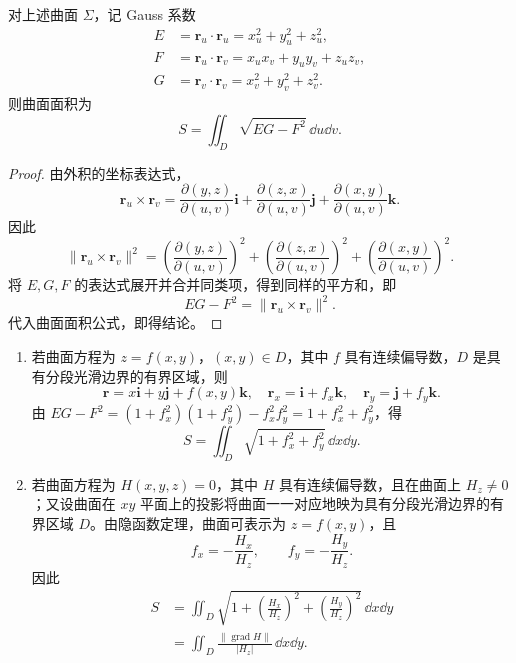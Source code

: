 \begin{theorem}
对上述曲面 $\Sigma$，记 Gauss 系数
\[
\begin{aligned}
E&=\boldsymbol r_u\cdot\boldsymbol r_u=x_u^2+y_u^2+z_u^2,\\
F&=\boldsymbol r_u\cdot\boldsymbol r_v=x_ux_v+y_uy_v+z_uz_v,\\
G&=\boldsymbol r_v\cdot\boldsymbol r_v=x_v^2+y_v^2+z_v^2.
\end{aligned}
\]
则曲面面积为
\[
S=\displaystyle\iint_D\sqrt{EG-F^2}\,\dd u\dd v.
\]
\end{theorem}
\begin{proof}
由外积的坐标表达式，
\[
\boldsymbol r_u\times\boldsymbol r_v
=\frac{\partial(y,z)}{\partial(u,v)}\boldsymbol i
+\frac{\partial(z,x)}{\partial(u,v)}\boldsymbol j
+\frac{\partial(x,y)}{\partial(u,v)}\boldsymbol k.
\]
因此
\[
\lVert\boldsymbol r_u\times\boldsymbol r_v\rVert^2
=\left(\frac{\partial(y,z)}{\partial(u,v)}\right)^2
+\left(\frac{\partial(z,x)}{\partial(u,v)}\right)^2
+\left(\frac{\partial(x,y)}{\partial(u,v)}\right)^2.
\]
将 $E,G,F$ 的表达式展开并合并同类项，得到同样的平方和，即
\[
EG-F^2=\lVert\boldsymbol r_u\times\boldsymbol r_v\rVert^2.
\]
代入曲面面积公式，即得结论。
\end{proof}

\begin{enumerate}
\item 若曲面方程为 $z=f(x,y)$，$(x,y)\in D$，其中 $f$ 具有连续偏导数，$D$ 是具有分段光滑边界的有界区域，则
\[
\boldsymbol r=x\boldsymbol i+y\boldsymbol j+f(x,y)\boldsymbol k,
\quad \boldsymbol r_x=\boldsymbol i+f_x\boldsymbol k,
\quad \boldsymbol r_y=\boldsymbol j+f_y\boldsymbol k.
\]
由 $EG-F^2=(1+f_x^2)(1+f_y^2)-f_x^2f_y^2=1+f_x^2+f_y^2$，得
\[
S=\displaystyle\iint_D\sqrt{1+f_x^2+f_y^2}\,\dd x\dd y.
\]
\item 若曲面方程为 $H(x,y,z)=0$，其中 $H$ 具有连续偏导数，且在曲面上 $H_z\ne0$；又设曲面在 $xy$ 平面上的投影将曲面一一对应地映为具有分段光滑边界的有界区域 $D$。由隐函数定理，曲面可表示为 $z=f(x,y)$，且
\[
f_x=-\frac{H_x}{H_z},\qquad f_y=-\frac{H_y}{H_z}.
\]
因此
\[
\begin{aligned}
S&=\displaystyle\iint_D\sqrt{1+\left(\frac{H_x}{H_z}\right)^2+\left(\frac{H_y}{H_z}\right)^2}\,\dd x\dd y\\
&=\displaystyle\iint_D\frac{\lVert\operatorname{grad}H\rVert}{|H_z|}\,\dd x\dd y.
\end{aligned}
\]
\end{enumerate}




